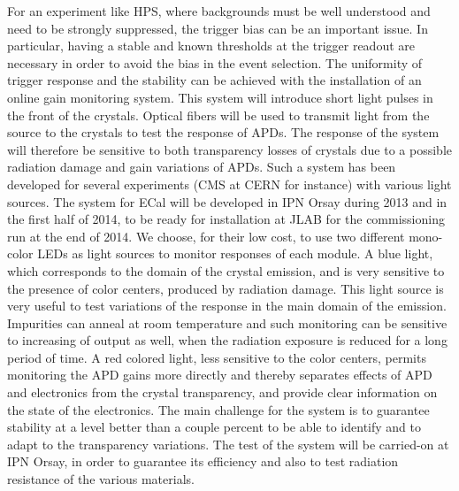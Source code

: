 For an experiment like HPS, where backgrounds must be well understood and need to be strongly suppressed, the trigger bias can be an important issue. In particular, having a stable and known thresholds at the trigger readout are necessary in order to avoid the bias in the event selection. The uniformity of trigger response and the stability can be achieved with the installation of an online gain monitoring system. This system will introduce short light pulses in the front of the crystals. Optical fibers will be used to transmit light from the source to the crystals to test the response of APDs. The response of the system will therefore be sensitive to both transparency losses of crystals due to a possible radiation damage and gain variations of APDs. Such a system has been developed for several experiments (CMS at CERN for instance) with various light sources. The system for ECal will be developed in IPN Orsay during 2013 and in the first half of 2014, to be ready for installation at JLAB for the commissioning run at the end of 2014. We choose, for their low cost, to use two different mono-color LEDs as light sources to monitor responses of each module. A blue light, which corresponds to the domain of the crystal emission, and is very sensitive to the presence of color centers, produced by radiation damage. This light source is very useful to test variations of the response in the main domain of the emission. Impurities can anneal at room temperature and such monitoring can be sensitive to increasing of output as well, when the radiation exposure is reduced for a long period of time. A red colored light, less sensitive to the color centers, permits monitoring the APD gains more directly and thereby separates effects of APD and electronics from the crystal transparency, and provide clear information on the state of the electronics. The main challenge for the system is to guarantee stability at a level better than a couple percent to be able to identify and to adapt to the transparency variations. The test of the system will be carried-on at IPN Orsay, in order to guarantee its efficiency and also to test radiation resistance of the various materials.


